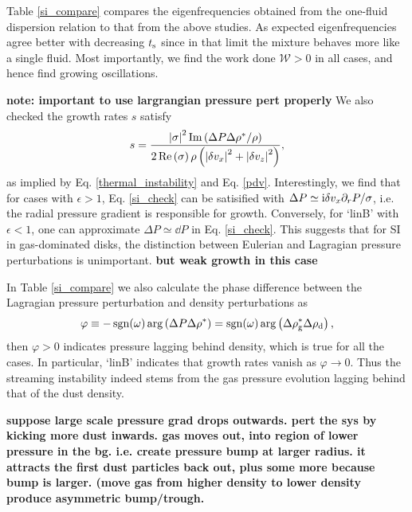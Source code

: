 Table \ref{si_compare} compares the eigenfrequencies obtained from the
one-fluid dispersion relation to that from the above studies. As  
expected eigenfrequencies agree better with decreasing $t_\mathrm{s}$ since
in that limit the mixture behaves more like a single fluid. Most 
importantly, we find the work done $\mathcal{W}>0$ in all cases, and
hence find growing oscillations. 

{\bf note: important to use largrangian pressure pert properly}
We also checked the growth rates $s$ satisfy 
\begin{align} 
  s = \frac{\left|\sigma\right|^2\operatorname{Im}\left(\Delta P
    \Delta\rho^*/\rho\right)}{2\operatorname{Re}\left(\sigma\right)\rho\left(\left|\delta
  v_x\right|^2+\left|\delta
  v_z\right|^2\right)}, \label{si_check}
\end{align}
as implied by Eq. \ref{thermal_instability} and
Eq. \ref{pdv}. %
Interestingly, we find that for cases with
$\epsilon>1$, Eq. \ref{si_check} can be satisified with $\Delta
P\simeq \mathrm{i}\delta v_x \partial_rP/\sigma$, i.e. the radial pressure gradient
is responsible for growth. Conversely, for `linB' with $\epsilon
< 1$, one can approximate $\Delta P \simeq \dd P$ in Eq. \ref{si_check}. This
suggests that for SI in gas-dominated disks, the distinction between
Eulerian and Lagragian pressure perturbations is unimportant. 
{\bf but weak growth in this case}

In Table \ref{si_compare} we also calculate the phase difference
between the Lagragian pressure perturbation and density perturbations
as    
\begin{align*} 
\varphi \equiv -\operatorname{sgn}(\omega)\arg\left(\Delta P\Delta\rho^*\right)
        = \operatorname{sgn}(\omega)\arg\left(\Delta\rho_\mathrm{g}^*\Delta\rho_\mathrm{d}\right),\notag
\end{align*}
then $\varphi > 0 $ indicates pressure lagging behind density, which
is true for all the cases. In particular, `linB' indicates that growth
rates vanish as $\varphi \to 0$.  
Thus the streaming instability indeed stems  
from the gas pressure evolution lagging behind that of the dust 
density. 



{\bf suppose large scale pressure grad drops outwards. 
pert the sys by kicking more dust inwards. gas moves out, into region 
  of lower pressure in the bg. i.e. create pressure bump at larger
  radius. it attracts the first dust particles back out, plus some more
  because bump is larger. (move gas from higher density to lower
  density produce asymmetric bump/trough.}

